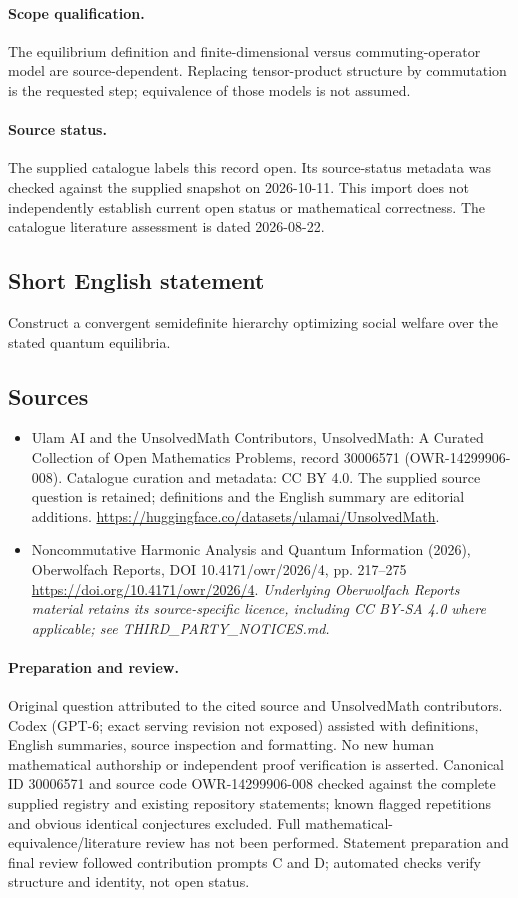 \documentclass[11pt]{article}
\begin{document}
\paragraph{Scope qualification.}
The equilibrium definition and finite-dimensional versus commuting-operator model are source-dependent. Replacing tensor-product structure by commutation is the requested step; equivalence of those models is not assumed.
\paragraph{Source status.}
The supplied catalogue labels this record open. Its source-status metadata was checked against the supplied snapshot on 2026-10-11. This import does not independently establish current open status or mathematical correctness. The catalogue literature assessment is dated 2026-08-22.
\subsection{Short English statement}
Construct a convergent semidefinite hierarchy optimizing social welfare over the stated quantum equilibria.
\subsection{Sources}
\begin{itemize}
\item[S1] Ulam AI and the UnsolvedMath Contributors, UnsolvedMath: A Curated Collection of Open Mathematics Problems, record 30006571 (OWR-14299906-008). Catalogue curation and metadata: CC BY 4.0. The supplied source question is retained; definitions and the English summary are editorial additions.
\url{https://huggingface.co/datasets/ulamai/UnsolvedMath}.
\item[S2] Noncommutative Harmonic Analysis and Quantum Information (2026), Oberwolfach Reports, DOI 10.4171/owr/2026/4, pp. 217--275
\url{https://doi.org/10.4171/owr/2026/4}.
\textit{Underlying Oberwolfach Reports material retains its source-specific licence, including CC BY-SA 4.0 where applicable; see THIRD\_PARTY\_NOTICES.md.}
\end{itemize}
\paragraph{Preparation and review.}
Original question attributed to the cited source and UnsolvedMath contributors. Codex (GPT-6; exact serving revision not exposed) assisted with definitions, English summaries, source inspection and formatting. No new human mathematical authorship or independent proof verification is asserted. Canonical ID 30006571 and source code OWR-14299906-008 checked against the complete supplied registry and existing repository statements; known flagged repetitions and obvious identical conjectures excluded. Full mathematical-equivalence/literature review has not been performed. Statement preparation and final review followed contribution prompts C and D; automated checks verify structure and identity, not open status.
\label{end:30006571}
\end{document}
